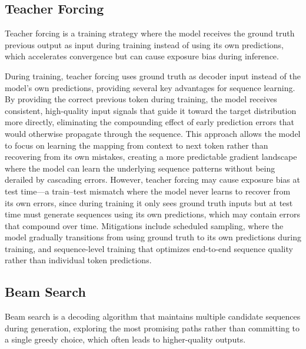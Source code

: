 \subsection{Teacher Forcing}

Teacher forcing is a training strategy where the model receives the ground truth previous output as input during training instead of using its own predictions, which accelerates convergence but can cause exposure bias during inference.

During training, teacher forcing uses ground truth as decoder input instead of the model's own predictions, providing several key advantages for sequence learning. By providing the correct previous token during training, the model receives consistent, high-quality input signals that guide it toward the target distribution more directly, eliminating the compounding effect of early prediction errors that would otherwise propagate through the sequence. This approach allows the model to focus on learning the mapping from context to next token rather than recovering from its own mistakes, creating a more predictable gradient landscape where the model can learn the underlying sequence patterns without being derailed by cascading errors. However, teacher forcing may cause exposure bias at test time—a train–test mismatch where the model never learns to recover from its own errors, since during training it only sees ground truth inputs but at test time must generate sequences using its own predictions, which may contain errors that compound over time. Mitigations include scheduled sampling, where the model gradually transitions from using ground truth to its own predictions during training, and sequence-level training that optimizes end-to-end sequence quality rather than individual token predictions.

\subsection{Beam Search}

Beam search is a decoding algorithm that maintains multiple candidate sequences during generation, exploring the most promising paths rather than committing to a single greedy choice, which often leads to higher-quality outputs.

